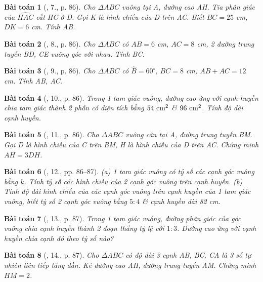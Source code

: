 \documentclass{article}
\newtheorem{baitoan}{Bài toán}
\begin{document}
\begin{baitoan}[\cite{Binh_Toan_9_tap_1}, 7., p. 86]
	Cho $\Delta ABC$ vuông tại A, đường cao AH. Tia phân giác của $\widehat{HAC}$ cắt HC ở D. Gọi K là hình chiếu của D trên AC. Biết $BC = 25$ {\rm cm}, $DK = 6$ {\rm cm}. Tính AB.
\end{baitoan}

\begin{baitoan}[\cite{Binh_Toan_9_tap_1}, 8., p. 86]
	Cho $\Delta ABC$ có $AB = 6$ {\rm cm}, $AC = 8$ {\rm cm}, 2 đường trung tuyến BD, CE vuông góc với nhau. Tính BC.
\end{baitoan}

\begin{baitoan}[\cite{Binh_Toan_9_tap_1}, 9., p. 86]
	Cho $\Delta ABC$ có $\widehat{B} = 60^\circ$, $BC = 8$ {\rm cm}, $AB + AC = 12$ {\rm cm}. Tính AB, AC.
\end{baitoan}

\begin{baitoan}[\cite{Binh_Toan_9_tap_1}, 10., p. 86]
	Trong 1 tam giác vuông, đường cao ứng với cạnh huyền chia tam giác thành 2 phần có diện tích bằng $\rm54\ cm^2$ \& $\rm96\ cm^2$. Tính độ dài cạnh huyền.
\end{baitoan}

\begin{baitoan}[\cite{Binh_Toan_9_tap_1}, 11., p. 86]
	Cho $\Delta ABC$ vuông cân tại A, đường trung tuyến BM. Gọi D là hình chiếu của C trên BM, H là hình chiếu của D trên AC. Chứng minh $AH = 3DH$.
\end{baitoan}

\begin{baitoan}[\cite{Binh_Toan_9_tap_1}, 12., pp. 86--87]
	(a) 1 tam giác vuông có tỷ số các cạnh góc vuông bằng $k$. Tính tỷ số các hình chiếu của 2 cạnh góc vuông trên cạnh huyền. (b) Tính độ dài hình chiếu của các cạnh góc vuông trên cạnh huyền của 1 tam giác vuông, biết tỷ số 2 cạnh góc vuông bằng $5:4$ \& cạnh huyền dài {\rm82 cm}.
\end{baitoan}

\begin{baitoan}[\cite{Binh_Toan_9_tap_1}, 13., p. 87]
	Trong 1 tam giác vuông, đường phân giác của góc vuông chia cạnh huyền thành 2 đoạn thẳng tỷ lệ với $1:3$. Đường cao ứng với cạnh huyền chia cạnh đó theo tỷ số nào?
\end{baitoan}

\begin{baitoan}[\cite{Binh_Toan_9_tap_1}, 14., p. 87]
	Cho $\Delta ABC$ có độ dài 3 cạnh AB, BC, CA là 3 số tự nhiên liên tiếp tăng dần. Kẻ đường cao AH, đường trung tuyến AM. Chứng minh $HM = 2$.
\end{baitoan}
\end{document}
